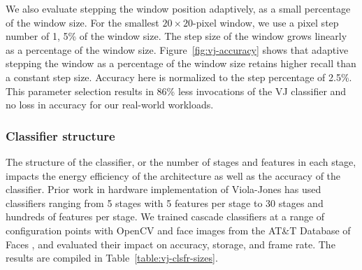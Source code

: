 We also evaluate stepping the window
position adaptively, as a small percentage of the window size. For the smallest $20\times 20$-pixel window, we use a
pixel step number of 1, 5\% of the window size. The step size of the window grows linearly as a
percentage of the window size. Figure~\ref{fig:vj-accuracy} shows that adaptive stepping the window as a percentage of the window size retains
higher recall than a constant step size. Accuracy here is normalized to the step percentage
of 2.5\%.
This parameter selection results in 86\% less invocations of the VJ classifier and no loss in accuracy for our real-world workloads.

\subsubsection{Classifier structure}
The structure of the classifier, or the number of stages and features in each stage,
impacts the energy efficiency of the architecture as well as the accuracy of the
classifier. Prior work in hardware implementation of Viola-Jones has used
classifiers ranging from 5 stages with 5 features per stage to 30 stages and
hundreds of features per stage. We trained cascade classifiers at a range of
configuration points with OpenCV and face images from
the AT\&T Database of Faces \cite{attfaces}, and evaluated their impact on accuracy, storage, and
frame rate. The results are compiled in Table~\ref{table:vj-clsfr-sizes}.

\begin{table}[h]
\centering
{}
\caption{Accuracy and storage for Viola-Jones classifiers.}
\label{table:vj-clsfr-sizes}
\end{table}



